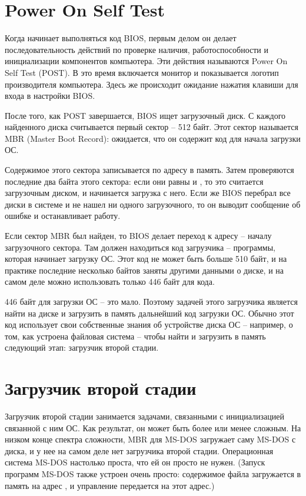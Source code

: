 \documentclass[a4page]{article}
\begin{document}
\section{Power On Self Test}

Когда начинает выполняться код BIOS, первым делом он делает последовательность действий
по проверке наличия, работоспособности и инициализации компонентов компьютера.
Эти действия называются Power On Self Test (POST).
В это время включается монитор и показывается логотип производителя компьютера.
Здесь же происходит ожидание нажатия клавиши для входа в настройки BIOS.

После того, как POST завершается, BIOS ищет загрузочный диск.
С каждого найденного диска считывается первый сектор -- 512 байт.
Этот сектор называется MBR (Master Boot Record): ожидается, что он содержит
код для начала загрузки ОС.

Содержимое этого сектора записывается по адресу  в память.
Затем проверяются последние два байта этого сектора: если они равны  и ,
то это считается загрузочным диском, и начинается загрузка с него.
Если же BIOS перебрал все диски в системе и не нашел ни одного загрузочного,
то он выводит сообщение об ошибке и останавливает работу.

Если сектор MBR был найден, то BIOS делает переход к адресу  --
началу загрузочного сектора.
Там должен находиться код загрузчика -- программы, которая начинает загрузку ОС.
Этот код не может быть больше 510 байт, и на практике последние несколько байтов заняты другими данными о диске,
и на самом деле можно использовать только 446 байт для кода.

446 байт для загрузки ОС -- это мало.
Поэтому задачей этого загрузчика является найти на диске и загрузить в память дальнейший код загрузки ОС.
Обычно этот код использует свои собственные знания об устройстве диска ОС -- например, о том, как устроена
файловая система -- чтобы найти и загрузить в память следующий этап: загрузчик второй стадии.

\section{Загрузчик второй стадии}

Загрузчик второй стадии занимается задачами, связанными с инициализацией связанной с ним ОС.
Как результат, он может быть более или менее сложным.
На низком конце спектра сложности, MBR для MS-DOS загружает саму MS-DOS с диска, и 
у нее на самом деле нет загрузчика второй стадии.
Операционная система MS-DOS настолько проста, что ей он просто не нужен.
(Запуск программ MS-DOS также устроен очень просто: содержимое файла загружается в память
на адрес , и управление передается на этот адрес.)
\end{document}
